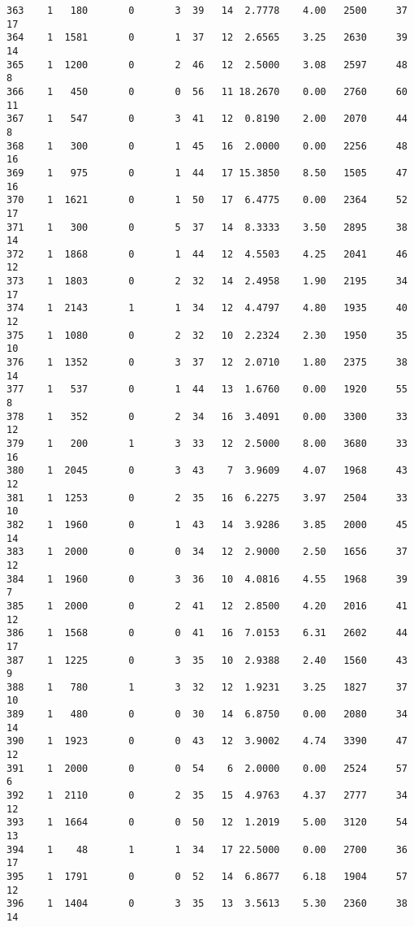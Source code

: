 \documentclass[
  letterpaper,
  DIV=11,
  numbers=noendperiod]{scrreprt}
\begin{document}
\begin{verbatim}
363    1   180       0       3  39   14  2.7778    4.00   2500     37      17
364    1  1581       0       1  37   12  2.6565    3.25   2630     39      14
365    1  1200       0       2  46   12  2.5000    3.08   2597     48       8
366    1   450       0       0  56   11 18.2670    0.00   2760     60      11
367    1   547       0       3  41   12  0.8190    2.00   2070     44       8
368    1   300       0       1  45   16  2.0000    0.00   2256     48      16
369    1   975       0       1  44   17 15.3850    8.50   1505     47      16
370    1  1621       0       1  50   17  6.4775    0.00   2364     52      17
371    1   300       0       5  37   14  8.3333    3.50   2895     38      14
372    1  1868       0       1  44   12  4.5503    4.25   2041     46      12
373    1  1803       0       2  32   14  2.4958    1.90   2195     34      17
374    1  2143       1       1  34   12  4.4797    4.80   1935     40      12
375    1  1080       0       2  32   10  2.2324    2.30   1950     35      10
376    1  1352       0       3  37   12  2.0710    1.80   2375     38      14
377    1   537       0       1  44   13  1.6760    0.00   1920     55       8
378    1   352       0       2  34   16  3.4091    0.00   3300     33      12
379    1   200       1       3  33   12  2.5000    8.00   3680     33      16
380    1  2045       0       3  43    7  3.9609    4.07   1968     43      12
381    1  1253       0       2  35   16  6.2275    3.97   2504     33      10
382    1  1960       0       1  43   14  3.9286    3.85   2000     45      14
383    1  2000       0       0  34   12  2.9000    2.50   1656     37      12
384    1  1960       0       3  36   10  4.0816    4.55   1968     39       7
385    1  2000       0       2  41   12  2.8500    4.20   2016     41      12
386    1  1568       0       0  41   16  7.0153    6.31   2602     44      17
387    1  1225       0       3  35   10  2.9388    2.40   1560     43       9
388    1   780       1       3  32   12  1.9231    3.25   1827     37      10
389    1   480       0       0  30   14  6.8750    0.00   2080     34      14
390    1  1923       0       0  43   12  3.9002    4.74   3390     47      12
391    1  2000       0       0  54    6  2.0000    0.00   2524     57       6
392    1  2110       0       2  35   15  4.9763    4.37   2777     34      12
393    1  1664       0       0  50   12  1.2019    5.00   3120     54      13
394    1    48       1       1  34   17 22.5000    0.00   2700     36      17
395    1  1791       0       0  52   14  6.8677    6.18   1904     57      12
396    1  1404       0       3  35   13  3.5613    5.30   2360     38      14

\end{verbatim}
\end{document}
